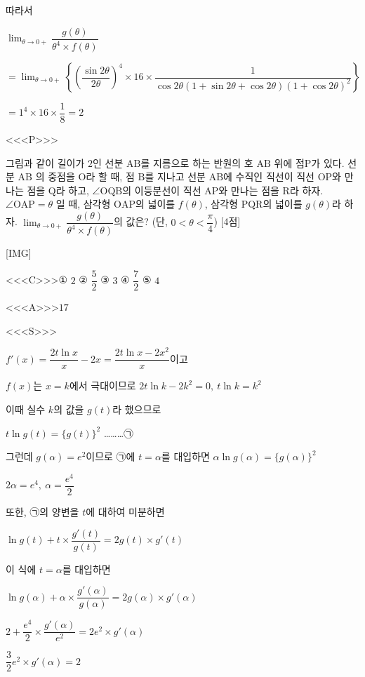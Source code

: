 \documentclass{oblivoir}
\begin{document}
따라서

$\displaystyle\lim_{\theta\rightarrow 0+}\dfrac{g(\theta)}{\theta^{4}\times f(\theta)}$

$ =\displaystyle\lim_{\theta\rightarrow 0+}\left\{\left(\dfrac{\sin 2\theta}{2\theta}\right)^{4}\times 16\times\dfrac{1}{\cos 2\theta(1+\sin 2\theta +\cos 2\theta)(1+\cos 2\theta)^{2}}\right\}$

$=1^{4}\times 16\times\dfrac{1}{8}=2$

<<<P>>>

그림과 같이 길이가 $2$인 선분 $\mathrm{AB}$를 지름으로 하는 반원의 호 $\mathrm{AB}$ 위에 점$\mathrm{P}$가 있다. 선분 $\mathrm{AB}$ 의 중점을 $\mathrm{O}$라 할 때, 점 $\mathrm{B}$를 지나고 선분 $\mathrm{AB}$에 수직인 직선이 직선 $\mathrm{OP}$와 만나는 점을 $\mathrm{Q}$라 하고, $\angle\mathrm{OQB}$의 이등분선이 직선 $\mathrm{AP}$와 만나는 점을 $\mathrm{R}$라 하자. $\angle\mathrm{OAP}=\theta$ 일 때, 삼각형 $\mathrm{OAP}$의 넓이를 $f(\theta)$,  삼각형 $\mathrm{PQR}$의 넓이를 $g(\theta)$라 하자. $\displaystyle\lim_{\theta\rightarrow 0+}\dfrac{g(\theta)}{\theta^{4}\times f(\theta)}$의 값은? (단, $0< \theta < \dfrac{\pi}{4}$) [4점]

[IMG]

<<<C>>>① $2$ ② $\dfrac{5}{2}$ ③ $3$  ④ $\dfrac{7}{2}$ ⑤ $4$

<<<A>>>$17$

<<<S>>>

$f'(x)=\dfrac{2t\ln x}{x}-2x=\dfrac{2t\ln x-2x^{2}}{x}$이고 

$f(x)$는 $x=k$에서 극대이므로 $2t\ln k-2k^{2}=0,\:t\ln k=k^{2}$

이때 실수 $k$의 값을 $g(t)$라 했으므로 

$t\ln g(t)=\{g(t)\}^{2}$   ………㉠

그런데  $g(\alpha)=e^{2}$이므로 ㉠에 $t=\alpha$를 대입하면 $\alpha\ln g(\alpha)=\{g(\alpha)\}^{2}$

$2\alpha =e^{4},\:\alpha =\dfrac{e^{4}}{2}$

또한, ㉠의 양변을 $t$에 대하여 미분하면

$\ln g(t)+t\times\dfrac{g'(t)}{g(t)}=2 g(t)\times g'(t)$

이 식에 $t=\alpha$를 대입하면

$\ln g(\alpha)+\alpha\times\dfrac{g'(\alpha)}{g(\alpha)}=2 g(\alpha)\times g'(\alpha)$

$2+\dfrac{e^{4}}{2}\times\dfrac{g'(\alpha)}{e^{2}}=2 e^{2}\times g'(\alpha)$

$\dfrac{3}{2}e^{2}\times g'(\alpha)=2$
\end{document}
